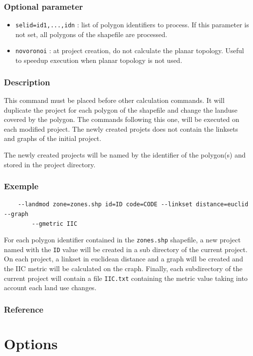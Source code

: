 \documentclass[a4paper,10pt]{report}
\begin{document}
\subsubsection{Optional parameter}
\begin{itemize}
	\item \verb|selid=id1,...,idn| : list of polygon identifiers to process. If this parameter is not set, all polygons of the shapefile are processed.
	\item \verb|novoronoi| : at project creation, do not calculate the planar topology. Useful to speedup execution when planar topology is not used.
\end{itemize}

\subsubsection{Description}
This command must be placed before other calculation commands. It will duplicate the project for each polygon of the shapefile and change the landuse covered by the polygon. The commands following this one, will be executed on each modified project. The newly created projets does not contain the linksets and graphs of the initial project.

The newly created projects will be named by the identifier of the polygon(s) and stored in the project directory.

\subsubsection{Exemple}
\begin{Verbatim}
	--landmod zone=zones.shp id=ID code=CODE --linkset distance=euclid --graph 
		--gmetric IIC
\end{Verbatim}
For each polygon identifier contained in the \verb|zones.shp| shapefile, a new project named with the \verb|ID| value will be created in a sub directory of the current project.
On each project, a linkset in euclidean distance and a graph will be created and the IIC metric will be calculated on the craph.
Finally, each subdirectory of the current project will contain a file \verb|IIC.txt| containing the metric value taking into account each land use changes.

\subsubsection{Reference}
\cite{2017_landmod}


\section{Options}
\end{document}
